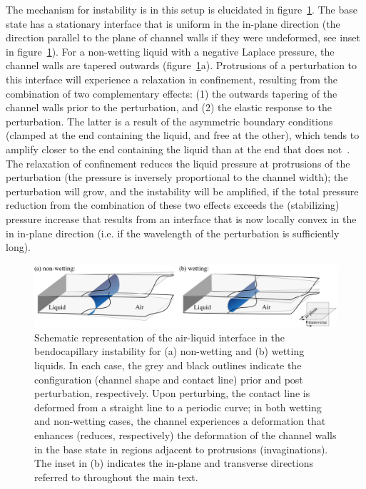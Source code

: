 \documentclass{jfm}
\begin{document}
The mechanism for instability is in this setup is elucidated in figure~\ref{fig:mechanism_schematic}. The base state has a stationary interface that is uniform in the in-plane direction (the direction parallel to the plane of channel walls if they were undeformed, see inset in figure~\ref{fig:mechanism_schematic}). For a non-wetting liquid with a negative Laplace pressure, the channel walls are tapered outwards (figure~\ref{fig:mechanism_schematic}a). Protrusions of a perturbation to this interface will experience a relaxation in confinement, resulting from the combination of two complementary effects: (1) the outwards tapering of the channel walls prior to the perturbation, and (2) the elastic response to the perturbation. The latter is a result of the asymmetric boundary conditions (clamped at the end containing the liquid, and free at the other), which tends to amplify closer to the end containing the liquid than at the end that does not~\citep{Bradley2019PRL}. The relaxation of confinement reduces the liquid pressure at protrusions of the perturbation (the pressure is inversely proportional to the channel width); the perturbation will grow, and the instability will be amplified, if the total pressure reduction from the combination of these two effects exceeds the (stabilizing) pressure increase that results from an interface that is now locally convex in the in in-plane direction (i.e. if the wavelength of the perturbation is sufficiently long).

\begin{figure}
    \centering
    \includegraphics[width=\textwidth]{figures/fig2_mechanism_schematic.pdf}
    \caption{Schematic representation of the air-liquid interface in the bendocapillary instability for (a) non-wetting and (b) wetting liquids. In each case, the grey and black outlines indicate the configuration (channel shape and contact line) prior and post perturbation, respectively. Upon perturbing, the contact line is deformed from a straight line to a periodic curve; in both wetting and non-wetting cases, the channel experiences a deformation that enhances (reduces, respectively) the deformation of the channel walls in the base state in regions adjacent to protrusions (invaginations). The inset in (b) indicates the in-plane and transverse directions referred to throughout the main text. }
    \label{fig:mechanism_schematic}
\end{figure}
\end{document}
